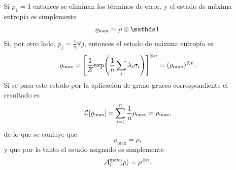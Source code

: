 Si $p_{1}=1$ entonces se eliminan los términos de error, y el estado de máxima entropía es simplemente
\begin{equation*}
    \varrho_{\max}=\rho\otimes\Id.
\end{equation*}
Si, por otro lado, $p_{j}=\frac{1}{n}\forall j$, entonces el estado de máxima entropía es
\begin{equation*}
    \varrho_{\max}=\qty[\frac{1}{Z}\text{exp}\qty(\frac{1}{n}\sum_{i}\lambda_{i}\sigma_{i})]^{\otimes n}=(\rho_{\max})^{\otimes n}.
\end{equation*}
Si se pasa este estado por la aplicación de grano grueso correspondiente el resultado es 
\begin{equation*}
    \mathcal{C}[\varrho_{\max}]=\sum_{j=1}^{n}\frac{1}{n}\rho_{\max}=\rho_{\max},
\end{equation*}
de  lo que se conluye que
\begin{equation*}
    \rho_{\max}=\rho,
\end{equation*}
y que por lo tanto el estado asignado es simplemente
\begin{equation*}
    \mathcal{A}_{\mathcal{C}}^{\max}(\rho)=\rho^{\otimes n}.
\end{equation*}